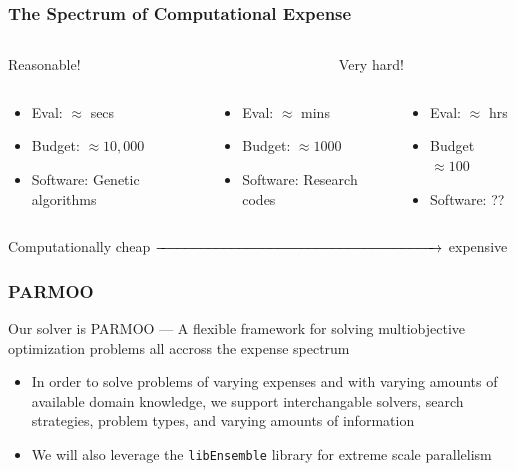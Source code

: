 \documentclass[aspectratio=169]{beamer}
\begin{document}
\begin{frame}\frametitle{The Spectrum of Computational Expense}
\begin{columns}
\begin{column}{.3\textwidth}
\begin{center}
Reasonable!
\end{center}
\end{column}
\begin{column}{.3\textwidth}
\end{column}
\begin{column}{.3\textwidth}
\begin{center}
Very hard!
\end{center}
\end{column}
\end{columns}
\bigskip
\begin{columns}
\begin{column}{.3\textwidth}
\begin{itemize}
\item Eval: $\approx$ secs
\item Budget: $\approx 10,000$
\item Software: Genetic algorithms
\end{itemize}
\end{column}
\begin{column}{.3\textwidth}
\begin{itemize}
\item Eval: $\approx$ mins
\item Budget: $\approx 1000$
\item Software: Research codes
\end{itemize}
\end{column}
\begin{column}{.3\textwidth}
\begin{itemize}
\item Eval: $\approx$ hrs
\item Budget $\approx 100$
\item Software: ??
\end{itemize}
\end{column}
\end{columns}
\bigskip
Computationally cheap $\xrightarrow{\hspace*{7cm}}$ expensive
\end{frame}

\begin{frame}\frametitle{PARMOO}
Our solver is PARMOO --- A flexible framework for solving multiobjective
optimization problems all accross the expense spectrum
\begin{itemize}
\item In order to solve problems of varying expenses and with varying
amounts of available domain knowledge, we support interchangable solvers,
search strategies, problem types, and varying amounts of information
\item We will also leverage the {\tt libEnsemble} library for extreme
scale parallelism
\end{itemize}
\end{frame}
\end{document}
